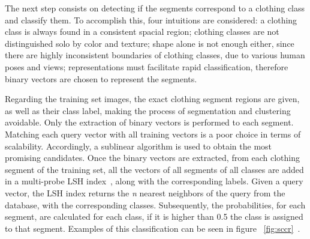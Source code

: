 \documentclass[titlepage,12pt,a4paper,times]{book}
\begin{document}
The next step consists on detecting if the segments correspond to a clothing
class and classify them. To accomplish this, four intuitions are considered: a
clothing class is always found in a consistent spacial region; clothing classes
are not distinguished solo by color and texture; shape alone is not enough
either, since there are highly inconsistent boundaries of clothing classes,
due to various human poses and views; representations must facilitate rapid
classification, therefore binary vectors are chosen to represent the segments.

Regarding the training set images, the exact clothing segment regions are given,
as well as their class label, making the process of segmentation and clustering
avoidable. Only the extraction of binary vectors is performed to each segment.
Matching each query vector with all training vectors is a poor choice in terms
of scalability. Accordingly, a sublinear algorithm is used to obtain the
most promising candidates. Once the binary vectors are extracted,
from each clothing segment of the training set, all the vectors of all segments
of all classes are added in a multi-probe \ac{LSH} index~\citep{11}, along
with the corresponding labels. Given a query vector, the \ac{LSH} index
returns the \emph{n} nearest neighbors of the query from the database, with
the corresponding classes. Subsequently, the probabilities, for each segment, are
calculated for each class, if it is higher than 0.5 the class is assigned to
that segment. Examples of this classification can be seen in figure
~\ref{fig:sccr}~\citep{3}.
\end{document}
